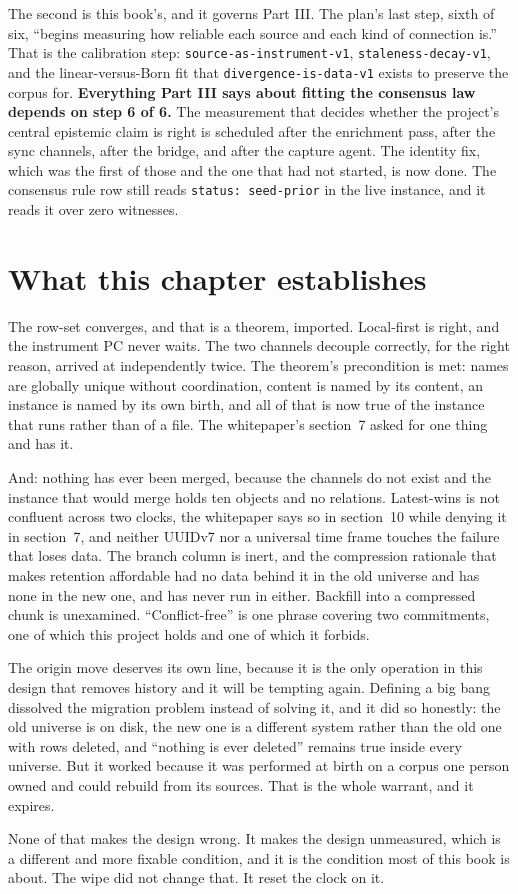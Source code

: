 The second is this book's, and it governs Part III. The plan's last step, sixth of six, ``begins measuring how reliable each source and each kind of connection is.'' That is the calibration step: \texttt{source-as-instrument-v1}, \texttt{staleness-decay-v1}, and the linear-versus-Born fit that \texttt{divergence-is-data-v1} exists to preserve the corpus for. \textbf{Everything Part III says about fitting the consensus law depends on step 6 of 6.} The measurement that decides whether the project's central epistemic claim is right is scheduled after the enrichment pass, after the sync channels, after the bridge, and after the capture agent. The identity fix, which was the first of those and the one that had not started, is now done. The consensus rule row still reads \texttt{status: seed-prior} in the live instance, and it reads it over zero witnesses.

\section{What this chapter establishes}

The row-set converges, and that is a theorem, imported. Local-first is right, and the instrument PC never waits. The two channels decouple correctly, for the right reason, arrived at independently twice. The theorem's precondition is met: names are globally unique without coordination, content is named by its content, an instance is named by its own birth, and all of that is now true of the instance that runs rather than of a file. The whitepaper's section~7 asked for one thing and has it.

And: nothing has ever been merged, because the channels do not exist and the instance that would merge holds ten objects and no relations. Latest-wins is not confluent across two clocks, the whitepaper says so in section~10 while denying it in section~7, and neither UUIDv7 nor a universal time frame touches the failure that loses data. The branch column is inert, and the compression rationale that makes retention affordable had no data behind it in the old universe and has none in the new one, and has never run in either. Backfill into a compressed chunk is unexamined. ``Conflict-free'' is one phrase covering two commitments, one of which this project holds and one of which it forbids.

The origin move deserves its own line, because it is the only operation in this design that removes history and it will be tempting again. Defining a big bang dissolved the migration problem instead of solving it, and it did so honestly: the old universe is on disk, the new one is a different system rather than the old one with rows deleted, and ``nothing is ever deleted'' remains true inside every universe. But it worked because it was performed at birth on a corpus one person owned and could rebuild from its sources. That is the whole warrant, and it expires.

None of that makes the design wrong. It makes the design unmeasured, which is a different and more fixable condition, and it is the condition most of this book is about. The wipe did not change that. It reset the clock on it.
